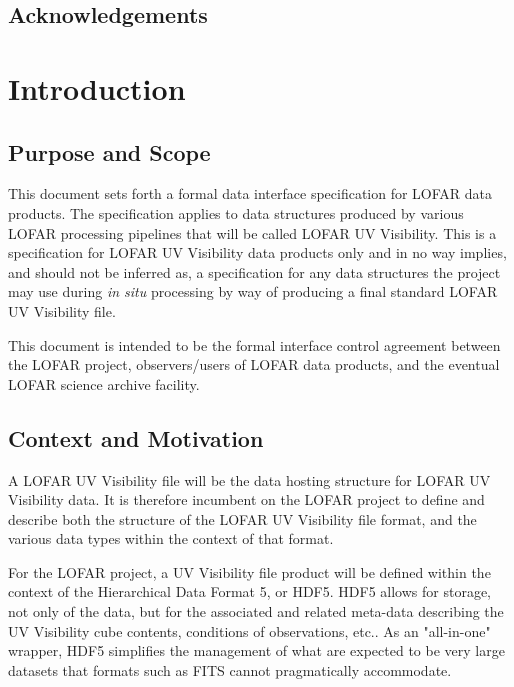\documentclass[a4paper,10pt,bibtotoc]{scrartcl}
\begin{document}






\subsection*{Acknowledgements}

\clearpage


\section{Introduction}
\label{sec:introduction}

\subsection{Purpose and Scope}
\label{sec:purpose and scope}

This document sets forth a formal data interface specification for
LOFAR data products.  The specification applies to data structures
produced by various LOFAR processing pipelines that will be called
LOFAR UV Visibility.  This is a specification for LOFAR UV Visibility
data products only and in no way implies, and should not be inferred
as, a specification for any data structures the project may use during
\textit{in situ} processing by way of producing a final standard LOFAR
UV Visibility file.

This document is intended to be the formal interface control agreement
between the LOFAR project, observers/users of LOFAR data products, and
the eventual LOFAR science archive facility.

\subsection{Context and Motivation}
\label{sec:context and motivation}

A LOFAR UV Visibility file will be the data hosting structure for
LOFAR UV Visibility data. It is therefore incumbent on the LOFAR
project to define and describe both the structure of the LOFAR UV
Visibility file format, and the various data types within the context
of that format.

For the LOFAR project, a UV Visibility file product will be defined
within the context of  the Hierarchical Data Format 5, or HDF5. HDF5
allows for  storage, not only of the data, but for the associated and
related meta-data describing the UV Visibility cube contents,
conditions of observations, etc.. As an "all-in-one" wrapper,  HDF5
simplifies the management of what are expected to be very large
datasets that formats such as FITS cannot pragmatically accommodate.
\end{document}
